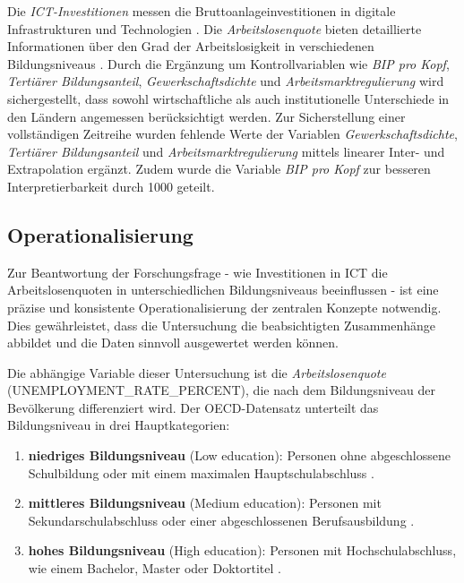 Die \textit{\ac{ICT}-Investitionen} messen die Bruttoanlageinvestitionen in digitale 
Infrastrukturen und Technologien \parencite{oecd2022ict}. Die \textit{Arbeitslosenquote} bieten 
detaillierte Informationen über den Grad der Arbeitslosigkeit in verschiedenen Bildungsniveaus 
\parencite{oecd2022unemployment}. Durch die Ergänzung um Kontrollvariablen wie 
\textit{\ac{BIP} pro Kopf}, \textit{Tertiärer Bildungsanteil}, \textit{Gewerkschaftsdichte} und 
\textit{Arbeitsmarktregulierung} wird sichergestellt, dass sowohl wirtschaftliche als auch 
institutionelle Unterschiede in den Ländern angemessen berücksichtigt werden. Zur Sicherstellung 
einer vollständigen Zeitreihe wurden fehlende Werte der Variablen \textit{Gewerkschaftsdichte}, 
\textit{Tertiärer Bildungsanteil} und \textit{Arbeitsmarktregulierung} mittels linearer Inter- 
und Extrapolation ergänzt. Zudem wurde die Variable \textit{\ac{BIP} pro Kopf} zur besseren 
Interpretierbarkeit durch 1000 geteilt.


\subsection{Operationalisierung}

Zur Beantwortung der Forschungsfrage - wie Investitionen in \ac{ICT} die Arbeitslosenquoten in 
unterschiedlichen Bildungsniveaus beeinflussen - ist eine präzise und konsistente 
Operationalisierung der zentralen Konzepte notwendig. Dies gewährleistet, dass die Untersuchung 
die beabsichtigten Zusammenhänge abbildet und die Daten sinnvoll ausgewertet werden können.

Die abhängige Variable dieser Untersuchung ist die \textit{Arbeitslosenquote} 
(UNEMPLOYMENT\_RATE\_PERCENT), die nach dem Bildungsniveau der Bevölkerung differenziert wird. 
Der \ac{OECD}-Datensatz unterteilt das Bildungsniveau in drei Hauptkategorien:

\begin{enumerate}

    \item \textbf{niedriges Bildungsniveau} (Low education): Personen ohne abgeschlossene 
    Schulbildung oder mit einem maximalen Hauptschulabschluss \parencite{oecd2022unemployment}.

    \item \textbf{mittleres Bildungsniveau} (Medium education): Personen mit 
    Sekundarschulabschluss oder einer abgeschlossenen Berufsausbildung 
    \parencite{oecd2022unemployment}.

    \item \textbf{hohes Bildungsniveau} (High education): Personen mit Hochschulabschluss, wie 
    einem Bachelor, Master oder Doktortitel \parencite{oecd2022unemployment}.

\end{enumerate}

